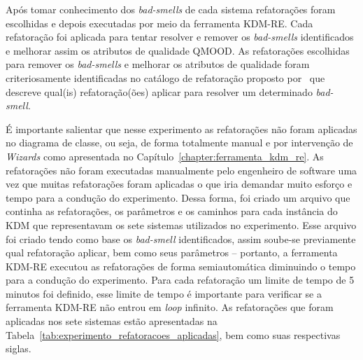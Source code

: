 Após tomar conhecimento dos \textit{bad-smells} de cada sistema refatorações foram escolhidas e depois executadas por meio da ferramenta KDM-RE. Cada refatoração foi aplicada para tentar resolver e remover os \textit{bad-smells} identificados e melhorar assim os atributos de qualidade QMOOD. As refatorações escolhidas para remover os \textit{bad-smells} e melhorar os atributos de qualidade foram criteriosamente identificadas no catálogo de refatoração proposto por~ que descreve qual(is) refatoração(ões) aplicar para resolver um determinado \textit{bad-smell}. 

É importante salientar que nesse experimento as refatorações não foram aplicadas no diagrama de classe, ou seja, de forma totalmente manual e por intervenção de \textit{Wizards} como apresentada no Capítulo~\ref{chapter:ferramenta_kdm_re}. As refatorações não foram executadas manualmente pelo engenheiro de software uma vez que muitas refatorações foram aplicadas o que iria demandar muito esforço e tempo para a condução do experimento. Dessa forma, foi criado um arquivo que continha as refatorações, os parâmetros e os caminhos para cada instância do KDM que representavam os sete sistemas utilizados no experimento. Esse arquivo foi criado tendo como base os \textit{bad-smell} identificados, assim soube-se previamente qual refatoração aplicar, bem como seus parâmetros – portanto, a ferramenta KDM-RE executou as refatorações de forma semiautomática diminuindo o tempo para a condução do experimento. Para cada refatoração um limite de tempo de 5 minutos foi definido, esse limite de tempo é importante para verificar se a ferramenta KDM-RE não entrou em \textit{loop} infinito.
As refatorações que foram aplicadas nos sete sistemas estão apresentadas na Tabela~\ref{tab:experimento_refatoracoes_aplicadas}, bem como suas respectivas siglas. 



